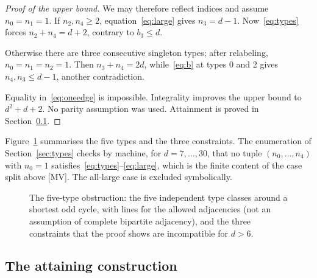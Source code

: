 \documentclass[11pt]{article}
\theoremstyle{remark}
\begin{document}
\begin{proof}[Proof of the upper bound]
We may therefore reflect indices and assume $n_0=n_1=1$. If $n_2,n_4\ge2$, equation~\eqref{eq:large} gives $n_3=d-1$. Now~\eqref{eq:types} forces $n_2+n_4=d+2$, contrary to $b_3\le d$.

Otherwise there are three consecutive singleton types; after relabeling, $n_0=n_1=n_2=1$. Then $n_3+n_4=2d$, while~\eqref{eq:b} at types 0 and 2 gives $n_4,n_3\le d-1$, another contradiction.

Equality in~\eqref{eq:oneedge} is impossible. Integrality improves the upper bound to $d^2+d+2$. No parity assumption was used. Attainment is proved in Section~\ref{sec:attain}.
\end{proof}

Figure~\ref{fig:types} summarises the five types and the three constraints. The enumeration of Section~\ref{sec:types} checks by machine, for $d=7,\ldots,30$, that no tuple $(n_0,\ldots,n_4)$ with $n_0=1$ satisfies~\eqref{eq:types}--\eqref{eq:large}, which is the finite content of the case split above [MV]. The all-large case is excluded symbolically.

\begin{figure}[ht]
\centering
{}
\caption{The five-type obstruction: the five independent type classes around a shortest odd cycle, with lines for the allowed adjacencies (not an assumption of complete bipartite adjacency), and the three constraints that the proof shows are incompatible for $d>6$.}
\label{fig:types}
\end{figure}

\subsection{The attaining construction}\label{sec:attain}
\end{document}
